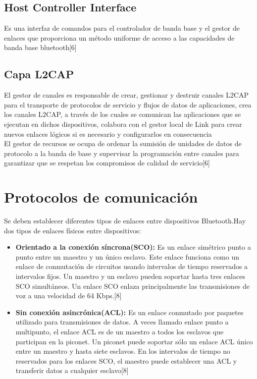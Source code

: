 \subsection{Host Controller Interface}
Es una interfaz de comandos para el controlador de banda base y el gestor de enlaces que proporciona un método uniforme de acceso a las capacidades de banda base bluetooth[6]

\subsection{Capa L2CAP}
El gestor de canales es responsable de crear, gestionar y destruir canales L2CAP para el transporte de protocolos de servicio y flujos de datos de aplicaciones, crea los canales L2CAP, a través de los cuales se comunican las aplicaciones que se ejecutan en dichos dispositivos, colabora con el gestor local de Link para crear nuevos enlaces lógicos si es necesario y configurarlos en consecuencia\\

El gestor de recursos se ocupa de ordenar la sumisión de unidades de datos de protocolo a la banda de base y supervisar la programación entre canales para garantizar que se respetan los compromisos de calidad de servicio[6]

\section{Protocolos de comunicación}
Se deben establecer diferentes tipos de enlaces entre dispositivos Bluetooth.Hay dos tipos de enlaces físicos entre dispositivos: 
\begin{itemize}
    \item \textbf{Orientado a la conexión síncrona(SCO):} Es un enlace simétrico punto a punto entre un maestro y un único esclavo. Este enlace funciona como un enlace de conmutación de circuitos usando intervalos de tiempo reservados a intervalos fijos. Un maestro y un esclavo pueden soportar hasta tres enlaces SCO simultáneos. Un enlace SCO enlaza principalmente las transmisiones de voz a una velocidad de 64 Kbps.[8]
    \item \textbf{Sin conexión asincrónica(ACL):} Es un enlace conmutado por paquetes utilizado para transmisiones de datos. A veces llamado enlace punto a multipunto, el enlace ACL es de un maestro a todos los esclavos que participan en la piconet. Un piconet puede soportar sólo un enlace ACL único entre un maestro y hasta siete esclavos. En los intervalos de tiempo no reservados para los enlaces SCO, el maestro puede establecer una ACL y transferir datos a cualquier esclavo[8]

\end{itemize}


